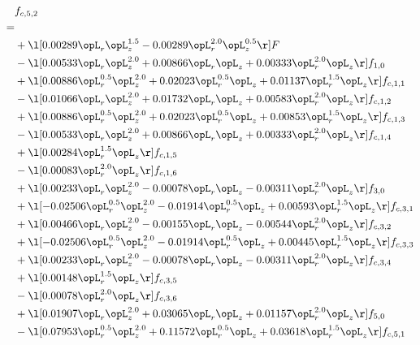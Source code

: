 \begin{alignat}{2} 
\label{eq:f_52_1} 
& f_{c,5,2} \nonumber \\ 
 = \\ 
& + \l[  0.00289 \opL_r \opL_z^{1.5}   -0.00289 \opL_r^{2.0} \opL_z^{0.5}  \r] F \nonumber \\ 
& - \l[  0.00533 \opL_r \opL_z^{2.0} +  0.00866 \opL_r \opL_z +  0.00333 \opL_r^{2.0} \opL_z  \r] f_{1,0} \nonumber \\ 
& + \l[  0.00886 \opL_r^{0.5} \opL_z^{2.0} +  0.02023 \opL_r^{0.5} \opL_z +  0.01137 \opL_r^{1.5} \opL_z  \r] f_{c,1,1} \nonumber \\ 
& - \l[  0.01066 \opL_r \opL_z^{2.0} +  0.01732 \opL_r \opL_z +  0.00583 \opL_r^{2.0} \opL_z  \r] f_{c,1,2} \nonumber \\ 
& + \l[  0.00886 \opL_r^{0.5} \opL_z^{2.0} +  0.02023 \opL_r^{0.5} \opL_z +  0.00853 \opL_r^{1.5} \opL_z  \r] f_{c,1,3} \nonumber \\ 
& - \l[  0.00533 \opL_r \opL_z^{2.0} +  0.00866 \opL_r \opL_z +  0.00333 \opL_r^{2.0} \opL_z  \r] f_{c,1,4} \nonumber \\ 
& + \l[  0.00284 \opL_r^{1.5} \opL_z  \r] f_{c,1,5} \nonumber \\ 
& - \l[  0.00083 \opL_r^{2.0} \opL_z  \r] f_{c,1,6} \nonumber \\ 
& + \l[  0.00233 \opL_r \opL_z^{2.0}   -0.00078 \opL_r \opL_z   -0.00311 \opL_r^{2.0} \opL_z  \r] f_{3,0} \nonumber \\ 
& + \l[  -0.02506 \opL_r^{0.5} \opL_z^{2.0}   -0.01914 \opL_r^{0.5} \opL_z +  0.00593 \opL_r^{1.5} \opL_z  \r] f_{c,3,1} \nonumber \\ 
& + \l[  0.00466 \opL_r \opL_z^{2.0}   -0.00155 \opL_r \opL_z   -0.00544 \opL_r^{2.0} \opL_z  \r] f_{c,3,2} \nonumber \\ 
& + \l[  -0.02506 \opL_r^{0.5} \opL_z^{2.0}   -0.01914 \opL_r^{0.5} \opL_z +  0.00445 \opL_r^{1.5} \opL_z  \r] f_{c,3,3} \nonumber \\ 
& + \l[  0.00233 \opL_r \opL_z^{2.0}   -0.00078 \opL_r \opL_z   -0.00311 \opL_r^{2.0} \opL_z  \r] f_{c,3,4} \nonumber \\ 
& + \l[  0.00148 \opL_r^{1.5} \opL_z  \r] f_{c,3,5} \nonumber \\ 
& - \l[  0.00078 \opL_r^{2.0} \opL_z  \r] f_{c,3,6} \nonumber \\ 
& + \l[  0.01907 \opL_r \opL_z^{2.0} +  0.03065 \opL_r \opL_z +  0.01157 \opL_r^{2.0} \opL_z  \r] f_{5,0} \nonumber \\ 
& - \l[  0.07953 \opL_r^{0.5} \opL_z^{2.0} +  0.11572 \opL_r^{0.5} \opL_z +  0.03618 \opL_r^{1.5} \opL_z  \r] f_{c,5,1} \nonumber \\ 

\end{alignat}
